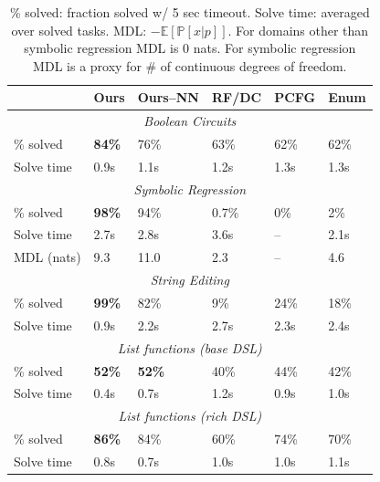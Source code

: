 \documentclass{article}
\newcommand{\expect}{\mathds{E}} %
\newcommand{\probability}{\mathds{P}} %
\begin{document}
\begin{table}
\tabcolsep=4pt
\renewcommand{\arraystretch}{0.5}
\begin{tabular}{llllll}
  \toprule& Ours&Ours--NN  & RF/DC & PCFG & Enum

  \\\midrule\multicolumn{6}{c}{\emph{Boolean Circuits}}\\\midrule
  \% solved &
  \textbf{84\%} &76\%& 63\%&62\%&62\%\\
  Solve time&  0.9s&  1.1s&1.2s&1.3s&1.3s

  \\\midrule\multicolumn{6}{c}{\emph{Symbolic Regression}}\\\midrule
  \% solved&   \textbf{98\% }&94\%&0.7\%&0\%&2\% \\
  Solve time&  2.7s& 2.8s  &3.6s&--&2.1s\\
  MDL (nats)&   9.3 &11.0&2.3&--&4.6

  \\\midrule\multicolumn{6}{c}{\emph{String Editing}}\\\midrule
  \% solved&\textbf{99\%} &82\% &9\%&24\%&18\%\\
  Solve time&  0.9s&2.2s&2.7s&2.3s&2.4s

  \\\midrule\multicolumn{6}{c}{\emph{List functions (base DSL)}}\\\midrule
  \% solved&\textbf{52\%} &\textbf{52\%} &40\%&44\%&42\%\\
  Solve time&  0.4s&0.7s&1.2s&0.9s&1.0s

  \\\midrule\multicolumn{6}{c}{\emph{List functions (rich DSL)}}\\\midrule
  \% solved&\textbf{86\%} &84\% &60\%&74\%&70\%\\
  Solve time&  0.8s&0.7s&1.0s&1.0s&1.1s
  \\\bottomrule
  \end{tabular}
\caption{\% solved: fraction solved w/ 5 sec timeout. Solve time: averaged over solved tasks. MDL: $-\expect\left[\probability[x|p] \right]$. For domains other than symbolic regression MDL is 0 nats. For symbolic regression MDL is a proxy for \# of continuous degrees of freedom.}\label{baselineComparisons}  \end{table}
\end{document}
